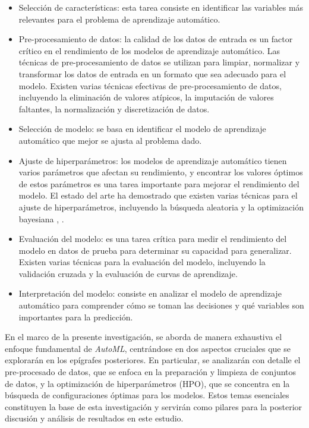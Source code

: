\begin{itemize}
	\item Selección de características: esta tarea consiste en identificar las variables más relevantes para el problema de aprendizaje automático. 
	\item Pre-procesamiento de datos: la calidad de los datos de entrada es un factor crítico en el rendimiento de los modelos de aprendizaje automático. Las técnicas de pre-procesamiento de datos se utilizan para limpiar, normalizar y transformar los datos de entrada en un formato que sea adecuado para el modelo. Existen varias técnicas efectivas de pre-procesamiento de datos, incluyendo la eliminación de valores atípicos, la imputación de valores faltantes, la normalización y discretización de datos.
	\item Selección de modelo: se basa en identificar el modelo de aprendizaje automático que mejor se ajusta al problema dado.
	\item Ajuste de hiperparámetros: los modelos de aprendizaje automático tienen varios parámetros que afectan su rendimiento, y encontrar los valores óptimos de estos parámetros es una tarea importante para mejorar el rendimiento del modelo. El estado del arte ha demostrado que existen varias técnicas para el ajuste de hiperparámetros, incluyendo la búsqueda aleatoria \citep{zoller2021benchmark} y la optimización bayesiana \citep{he2021automl}, \citep{hutter2019automated}.
	\item Evaluación del modelo: es una tarea crítica para medir el rendimiento del modelo en datos de prueba para determinar su capacidad para generalizar. Existen varias técnicas para la evaluación del modelo, incluyendo la validación cruzada y la evaluación de curvas de aprendizaje.
	\item Interpretación del modelo: consiste en analizar el modelo de aprendizaje automático para comprender cómo se toman las decisiones y qué variables son importantes para la predicción.
\end{itemize}

En el marco de la presente investigación, se aborda de manera exhaustiva el enfoque fundamental de \textit{AutoML}, centrándose en dos aspectos cruciales que se explorarán en los epígrafes posteriores. En particular, se analizarán con detalle el pre-procesado de datos, que se enfoca en la preparación y limpieza de conjuntos de datos, y la optimización de hiperparámetros (HPO), que se concentra en la búsqueda de configuraciones óptimas para los modelos. Estos temas esenciales constituyen la base de esta investigación y servirán como pilares para la posterior discusión y análisis de resultados en este estudio. 


